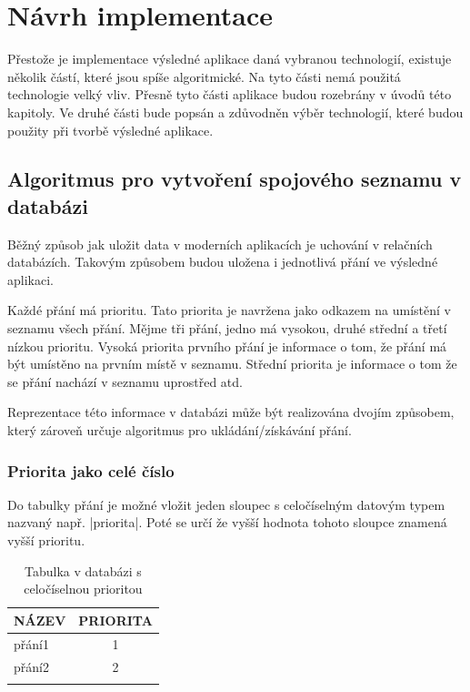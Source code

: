 \section{Návrh implementace}
Přestože je implementace výsledné aplikace daná vybranou technologií, existuje několik částí, které jsou spíše algoritmické. Na tyto části nemá použitá technologie velký vliv. Přesně tyto části aplikace budou rozebrány v úvodů této kapitoly.
Ve druhé části bude popsán a zdůvodněn výběr technologií, které budou použity při tvorbě výsledné aplikace.

\subsection{Algoritmus pro vytvoření spojového seznamu v databázi}
Běžný způsob jak uložit data v moderních aplikacích je uchování v relačních databázích. Takovým způsobem budou uložena i jednotlivá přání ve výsledné aplikaci.

Každé přání má prioritu. Tato priorita je navržena jako odkazem na umístění v seznamu všech přání. Mějme tři přání, jedno má vysokou, druhé střední a třetí nízkou prioritu. Vysoká priorita prvního přání je informace o tom, že přání má být umístěno na prvním místě v seznamu. Střední priorita je informace o tom že se přání nachází v seznamu uprostřed atd.

Reprezentace této informace v databázi může být realizována dvojím způsobem, který zároveň určuje algoritmus pro ukládání/získávání přání.

\subsubsection{Priorita jako celé číslo}
Do tabulky přání je možné vložit jeden sloupec s celočíselným datovým typem nazvaný např. |priorita|. Poté se určí že vyšší hodnota tohoto sloupce znamená vyšší prioritu.
\begin{table}[htb]
	\begin{center}
	  \begin{tabular}{ | l | c | }
	    \hline
	    NÁZEV & PRIORITA  \\ \hline \hline
	    přání1 & 1  \\ \hline
	    přání2 & 2 \\ \hline
	     &  \\ \hline
	  \end{tabular}
	  \caption{Tabulka v databázi s celočíselnou prioritou}
	  \label{tab:integer-priority}
	\end{center}
\end{table}



